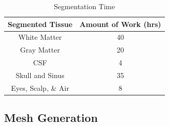 
\begin{table}[H]
\centering
\caption{Segmentation Time}
\label{tab:seg}
\begin{tabular}{|c|c|}
\hline
Segmented Tissue    & Amount of Work (hrs) \\ \hline
White Matter       & 40                   \\ \hline
Gray Matter         & 20                   \\ \hline
CSF                 & 4                    \\ \hline
Skull and Sinus     & 35                   \\ \hline
Eyes, Scalp, \& Air & 8                    \\ \hline
\end{tabular}
\end{table}

\subsection{Mesh Generation}
\label{sec:mesh}


